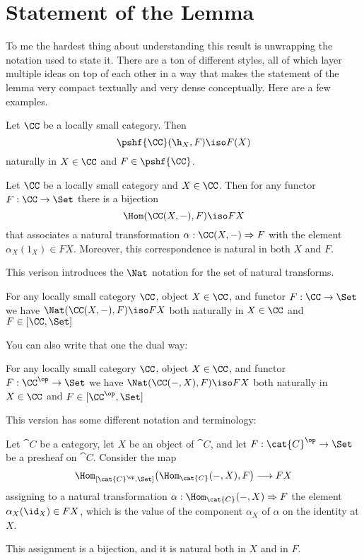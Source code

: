 \documentclass[12pt]{article}
\begin{document}
\section{Statement of the Lemma}

To me the hardest thing about understanding this result is unwrapping the notation used to state it.
There are a ton of different styles, all of which layer multiple ideas on top of each other in a way that
makes the statement of the lemma very compact textually and very dense conceptually. Here are a few examples.

\begin{lemma}[Yoneda]   
\label{yoneda1}
Let $\CC$ be a locally small category.  Then
% 
\begin{equation}        
\label{eq:yoneda}
\pshf{\CC}(\h_X, F)
\iso
F(X)
\end{equation}
% 
naturally in $X \in \CC$ and $F \in \pshf{\CC}$.  
\end{lemma}

\begin{lemma}[Yoneda]\label{yoneda2} Let $\CC$ be a locally small category and $X \in
\CC$. Then for any functor $F : \CC \to \Set$ there is a bijection
$$
\Hom(\CC(X,-), F) \iso FX
$$
that associates a natural transformation $\alpha:\CC(X,-) \Rightarrow F$ with the element
$\alpha_X(1_X) \in FX$. Moreover, this correspondence is natural in both $X$ and $F$.
\end{lemma}

\noindent This verison introduces the $\Nat$ notation for the set of natural transforms.

\begin{lemma}[Yoneda]\label{yoneda3} For any locally small category $\CC$, object $X
\in \CC$, and functor $F:\CC \to \Set$ we have  $\Nat(\CC(X,-),F) \iso FX$
both naturally in $X \in \CC$ and $F \in [\CC, \Set]$
\end{lemma}

\noindent You can also write that one the dual way:
\begin{lemma}[Yoneda]\label{yoneda4} For any locally small category $\CC$, object
$X \in \CC$, and functor $F:\CC^{\op} \to \Set$ we have  $\Nat(\CC(-,X),F)
\iso FX$ both naturally in $X \in \CC$ and $F \in [\CC^{\op}, \Set]$
\end{lemma}

\noindent
This version has some different notation and terminology:

\begin{lemma}[Yoneda]\label{yoneda5}
 Let $\cat{C}$ be a category, let $X$ be an object of $\cat{C}$, and let $F:\cat{C}^\op\to\Set$ be a presheaf on $\cat{C}$. 
 Consider the map 
 $$
 \Hom_{[\cat{C}^\op,\Set]} \bigl(\Hom_\cat{C} (-,X) , F \bigr) \longrightarrow FX
 $$
 assigning to a natural transformation $\alpha:\Hom_\cat{C} (-,X)\Rightarrow F$ the element $\alpha_X(\id_X)\in FX$, which is the value of the component $\alpha_X$ of $\alpha$ on the identity at $X$. 

 This assignment is a bijection, and it is natural both in $X$ and in $F$.
\end{lemma}
\end{document}
